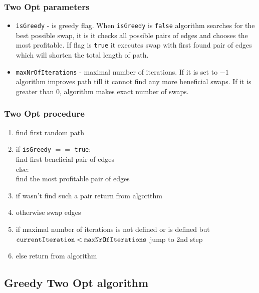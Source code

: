\documentclass[titlepage]{article}
\begin{document}
\subsubsection{Two Opt parameters}

\begin{itemize}
	\item \texttt{isGreedy} - is greedy flag. When \texttt{isGreedy} is \texttt{false} algorithm searches for the best possible swap, it is it checks all possible pairs of edges and chooses the most profitable. If flag is \texttt{true} it executes swap with first found pair of edges which will shorten the total length of path.
	
	\item \texttt{maxNrOfIterations} - maximal number of iterations. If it is set to $-1$ algorithm improves path till it cannot find any more beneficial swaps. If it is greater than $0$, algorithm makes exact number of swaps.	
\end{itemize}

\subsubsection{Two Opt procedure}

\begin{enumerate}
	\item find first random path
	\item if \texttt{isGreedy} $==$ \texttt{true}: \\
	\hspace*{5mm} find first beneficial pair of edges \\
	else:\\
	\hspace*{5mm} find the most profitable pair of edges
	\item if wasn't find such a pair return from algorithm
	\item otherwise swap edges
	\item if maximal number of iterations is not defined or is defined but $\mbox{\texttt{currentIteration}} < \mbox{\texttt{maxNrOfIterations}}$ jump to 2nd step
	\item else return from algorithm
\end{enumerate}


\subsection{Greedy Two Opt algorithm}
\end{document}
